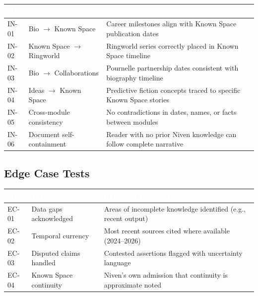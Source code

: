 \documentclass[11pt,letterpaper]{article}
\newcommand{\tableheader}[1]{\textbf{\sffamily\textcolor{white}{#1}}}
\begin{document}
\begin{center}
\begin{tabularx}{\textwidth}{C{1.2cm}L{3.5cm}X}
\toprule
{}
\tableheader{ID} & \tableheader{Verifies} & \tableheader{Expected Behavior} \\
\midrule
IN-01 & Bio $\rightarrow$ Known Space & Career milestones align with Known Space publication dates \\
IN-02 & Known Space $\rightarrow$ Ringworld & Ringworld series correctly placed in Known Space timeline \\
IN-03 & Bio $\rightarrow$ Collaborations & Pournelle partnership dates consistent with biography timeline \\
IN-04 & Ideas $\rightarrow$ Known Space & Predictive fiction concepts traced to specific Known Space stories \\
IN-05 & Cross-module consistency & No contradictions in dates, names, or facts between modules \\
IN-06 & Document self-containment & Reader with no prior Niven knowledge can follow complete narrative \\
\bottomrule
\end{tabularx}
\end{center}

\subsection{Edge Case Tests}

\begin{center}
\begin{tabularx}{\textwidth}{C{1.2cm}L{3.5cm}X}
\toprule
{}
\tableheader{ID} & \tableheader{Verifies} & \tableheader{Expected Behavior} \\
\midrule
EC-01 & Data gaps acknowledged & Areas of incomplete knowledge identified (e.g., recent output) \\
EC-02 & Temporal currency & Most recent sources cited where available (2024--2026) \\
EC-03 & Disputed claims handled & Contested assertions flagged with uncertainty language \\
EC-04 & Known Space continuity & Niven's own admission that continuity is approximate noted \\
\bottomrule
\end{tabularx}
\end{center}
\end{document}
